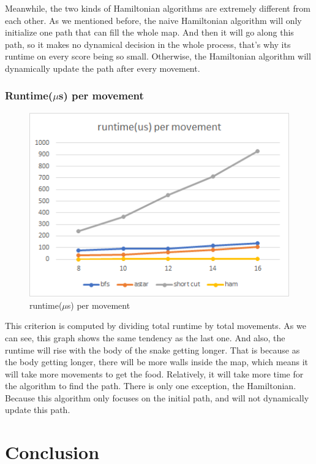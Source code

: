 \documentclass[12pt]{article}
\begin{document}
Meanwhile, the two kinds of Hamiltonian algorithms are extremely different from each other. As we mentioned before, the naive Hamiltonian algorithm will only initialize one path that can fill the whole map. And then it will go along this path, so it makes no dynamical decision in the whole process, that's why its runtime on every score being so small. Otherwise, the Hamiltonian algorithm will dynamically update the path after every movement. 

\subsubsection{Runtime($\mu$s) per movement}



\begin{figure}[H]
    \centering 
    \includegraphics[scale = 0.9]{anay3.png}
    \caption{runtime($\mu$s) per movement}
\end{figure}

This criterion is computed by dividing total runtime by total movements. As we can see, 
this graph shows the same tendency as the last one. And also, the runtime will rise with the 
body of the snake getting longer. That is because as the body getting longer, there will be 
more walls inside the map, which means it will take more movements to get the food. Relatively, 
it will take more time for the algorithm to find the path. There is only one exception, 
the Hamiltonian. Because this algorithm only focuses on the initial path, and will not dynamically 
update this path.

\section{Conclusion}
\end{document}
